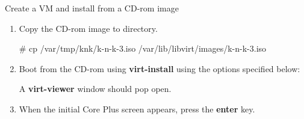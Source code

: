 \begin{Lab}
\begin{exe} {Create a VM and install from a CD-rom image}
	\begin{enumerate}
		\item Copy the CD-rom image to 
			directory. 
		\begin{raw}
# cp /var/tmp/knk/k-n-k-3.iso /var/lib/libvirt/images/k-n-k-3.iso  
		\end{raw}
	\item Boot from the CD-rom using \textbf{virt-install} using the options specified below:
			A \textbf{virt-viewer} window should pop open. 
		\item When the initial Core Plus screen appears, press the \textbf{enter} key.


\end{enumerate}
\end{exe}
\end{Lab}
